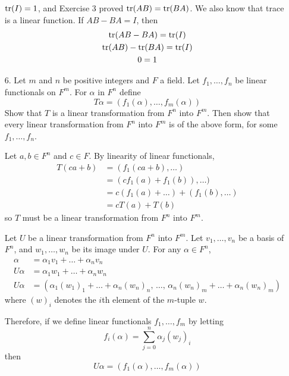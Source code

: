 \documentclass{article}
\begin{document}
\begin{enumerate}[listparindent=\parindent]
    \(\operatorname{tr}(I) = 1\), and Exercise 3 proved \(\operatorname{tr}(AB) = \operatorname{tr}(BA)\). We also know that trace is a linear function.
    If \(AB - BA = I\), then
    \begin{gather*}
        \operatorname{tr}(AB - BA) = \operatorname{tr}(I) \\
        \operatorname{tr}(AB) - \operatorname{tr}(BA) = \operatorname{tr}(I) \\
        0 = 1
    \end{gather*}

\item[6.] Let \(m\) and \(n\) be positive integers and \(F\) a field.
    Let \(f_1, \dots, f_n\) be linear functionals on \(F^m\). For \(\alpha\) in \(F^n\) define
    \[ T\alpha = (f_1(\alpha), \dots, f_m(\alpha)) \]
    Show that \(T\) is a linear transformation from \(F^n\) into \(F^m\).
    Then show that every linear transformation from \(F^n\) into \(F^m\) is of the above form, for some \(f_1, \dots, f_n\).

    Let \(a, b \in F^n\) and \(c \in F\). By linearity of linear functionals,
    \begin{align*}
        T(ca + b) &= (f_1(ca + b), \dots) \\
                  &= (cf_1(a) + f_1(b)), \dots) \\
                  &= c(f_1(a) + \dots) + (f_1(b), \dots) \\
                  &= cT(a) + T(b)
    \end{align*}
    so \(T\) must be a linear transformation from \(F^n\) into \(F^m\).

    Let \(U\) be a linear transformation from \(F^n\) into \(F^m\).
    Let \(v_1, \dots, v_n\) be a basis of \(F^n\), and \(w_1, \dots, w_n\) be its image under \(U\).
    For any \(\alpha \in F^n\),
    \begin{align*}
        \alpha &= \alpha_1v_1 + \dots + \alpha_nv_n \\
        U\alpha &= \alpha_1w_1 + \dots + \alpha_nw_n \\
        U\alpha &= (\alpha_1(w_1)_1 + \dots + \alpha_n(w_n)_n,\, \dots,\, \alpha_n(w_n)_m + \dots + \alpha_n(w_n)_m)
    \end{align*}
    where \((w)_i\) denotes the \(i\)th element of the \(m\)-tuple \(w\).

    Therefore, if we define linear functionals \(f_1, \dots, f_m\) by letting
    \[f_i(\alpha) = \sum_{j=0}^n \alpha_j(w_j)_i\]
    then
    \[U\alpha = (f_1(\alpha), \dots, f_m(\alpha))\]


\end{enumerate}
\end{document}
